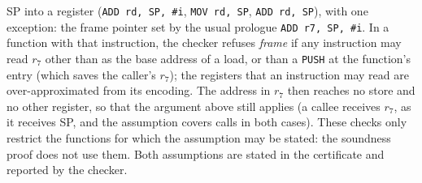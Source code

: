 \documentclass[oneside,english]{amsart}
\numberwithin{equation}{section}
\theoremstyle{plain}
\theoremstyle{definition}
\theoremstyle{plain}
\theoremstyle{plain}
\theoremstyle{remark}
\begin{document}
SP into a register (\texttt{ADD rd, SP, \#i}, \texttt{MOV rd, SP}, \texttt{ADD rd, SP}), with one exception: the frame pointer set by the usual prologue \texttt{ADD r7, SP, \#i}. In a function with that instruction, the checker refuses \emph{frame} if any instruction may read $r_7$ other than as the base address of a load, or than a \texttt{PUSH} at the function's entry (which saves the caller's $r_7$); the registers that an instruction may read are over-approximated from its encoding. The address in $r_7$ then reaches no store and no other register, so that the argument above still applies (a callee receives $r_7$, as it receives SP, and the assumption covers calls in both cases). These checks only restrict the functions for which the assumption may be stated: the soundness proof does not use them. Both assumptions are stated in the certificate and reported by the checker.
\end{document}
